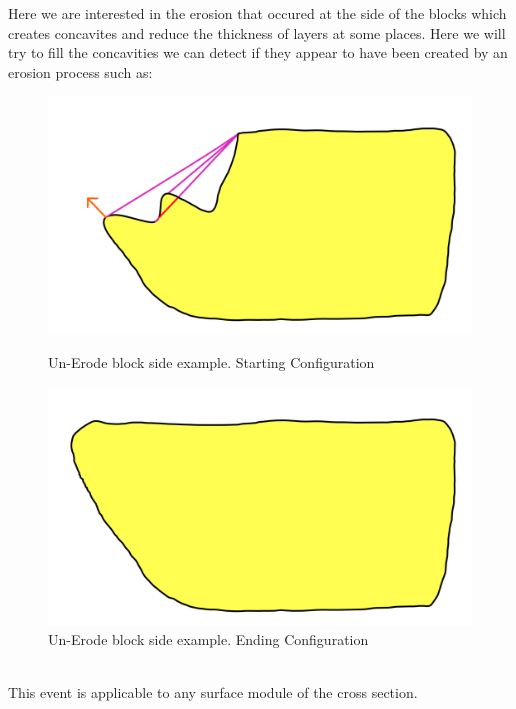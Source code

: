 \documentclass[12pt, a4paper]{report} %
\begin{document}
Here we are interested in the erosion that occured at the side of the blocks which creates concavites and reduce the thickness of layers at some places. Here we will try to fill the concavities we can detect if they appear to have been created by an erosion process such as:
\begin{figure}[h]
    \begin{minipage}[c]{.46\linewidth}
        \centering
        \includegraphics[scale=0.2]{unErodeSideDescription0.png}
	\caption{Un-Erode block side example. Starting Configuration}
    \end{minipage}
    \hfill%
    \begin{minipage}[c]{.46\linewidth}
        \centering
        \includegraphics[scale=0.2]{unErodeSideDescription1.png}
	\caption{Un-Erode block side example. Ending Configuration}
    \end{minipage}
\end{figure}\\
This event is applicable to any surface module of the cross section.\\\\
\end{document}
